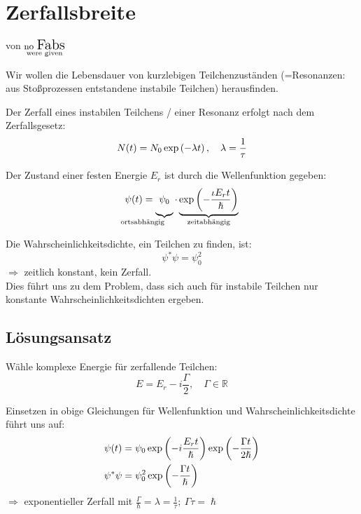 \documentclass[Ex4_Zusammenfassung.tex]{subfiles}
\begin{document}
\section{Zerfallsbreite}
von \textbf{$\mathop{\text{\small{no} \Large Fabs}}\limits_{\text{were given}}$}

Wir wollen die Lebensdauer von kurzlebigen Teilchenzuständen (=Resonanzen: aus Stoßprozessen entstandene instabile Teilchen) herausfinden.

Der Zerfall eines instabilen Teilchens / einer Resonanz erfolgt nach dem Zerfallsgesetz:
\begin{equation}
	N(t) = N_0 \exp \left( - \lambda t \right), \quad \lambda = \frac{1}{\tau}
\end{equation}

Der Zustand einer festen Energie $E_r$ ist durch die Wellenfunktion gegeben:
\begin{equation}
	\psi(t) = \underbrace{ \vphantom{\lp - \frac{i E_r t}{\hslash} \rp} \psi_0}_{\mathllap{\text{ortsabhängig}}} \cdot \underbrace{\exp \lp - \frac{\iota E_r t}{\hslash} \rp}_{\mathclap{\text{zeitabhängig}}}
\end{equation}

Die Wahrscheinlichkeitsdichte, ein Teilchen zu finden, ist:
\begin{equation}
	\psi^* \psi = \psi_0^2
\end{equation}
$\Rightarrow$ zeitlich konstant, kein Zerfall.\\
Dies führt uns zu dem Problem, dass sich auch für instabile Teilchen nur konstante Wahrscheinlichkeitsdichten ergeben.

\subsection*{Lösungsansatz}
Wähle komplexe Energie für zerfallende Teilchen:
\begin{equation}
	E = E_r - i \frac{\Gamma}{2}, \quad \Gamma \in \mathbb{R}
\end{equation}

Einsetzen in obige Gleichungen für Wellenfunktion und Wahrscheinlichkeitsdichte führt uns auf:
\begin{align}
	\psi(t) &= \psi_0 \exp \left( -i \frac{E_r t}{\hslash}\right) \exp \left( -\frac{\Gamma t}{2 \hslash} \right)\\
	\psi^* \psi &= \psi_0^2 \exp \left( -\frac{\Gamma t}{\hslash}  \right)
\end{align}
$\Rightarrow$ exponentieller Zerfall mit $\frac{\Gamma}{\hslash} = \lambda = \frac{1}{\tau};\ \Gamma \tau = \hslash$\\
\end{document}
